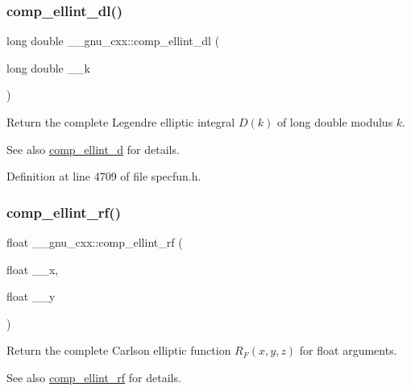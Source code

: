 \subsubsection{\texorpdfstring{comp\+\_\+ellint\+\_\+dl()}{comp\_ellint\_dl()}}
{\footnotesize\ttfamily long double \+\_\+\+\_\+gnu\+\_\+cxx\+::comp\+\_\+ellint\+\_\+dl (\begin{DoxyParamCaption}\item[{long double}]{\+\_\+\+\_\+k }\end{DoxyParamCaption})\hspace{0.3cm}{\ttfamily [inline]}}

Return the complete Legendre elliptic integral $ D(k) $ of {\ttfamily long double} modulus $ k $.

\begin{DoxySeeAlso}{See also}
\hyperlink{group__gnu__math__spec__func_ga3fe79a91524b43ffc5ffb83c0eb2bd00}{comp\+\_\+ellint\+\_\+d} for details. 
\end{DoxySeeAlso}


Definition at line 4709 of file specfun.\+h.

\mbox{\label{group__gnu__math__spec__func_ga55ae30b4f8ff15017d18a80050e14e38}} 
\subsubsection{\texorpdfstring{comp\+\_\+ellint\+\_\+rf()}{comp\_ellint\_rf()}\hspace{0.1cm}{\footnotesize\ttfamily [1/3]}}
{\footnotesize\ttfamily float \+\_\+\+\_\+gnu\+\_\+cxx\+::comp\+\_\+ellint\+\_\+rf (\begin{DoxyParamCaption}\item[{float}]{\+\_\+\+\_\+x,  }\item[{float}]{\+\_\+\+\_\+y }\end{DoxyParamCaption})\hspace{0.3cm}{\ttfamily [inline]}}

Return the complete Carlson elliptic function $ R_F(x,y,z) $ for {\ttfamily float} arguments.

\begin{DoxySeeAlso}{See also}
\hyperlink{group__gnu__math__spec__func_ga55ae30b4f8ff15017d18a80050e14e38}{comp\+\_\+ellint\+\_\+rf} for details. 
\end{DoxySeeAlso}


